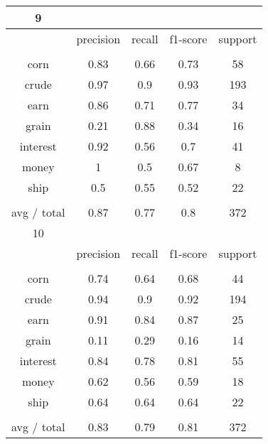 \documentclass[11pt]{article}
\begin{document}
\begin{center}
\begin{longtable}{| c | c | c | c | c |}
9           &           &        &          &         \\
\hline
           & precision & recall & f1-score & support \\
           &           &        &          &         \\
corn        & 0.83      & 0.66   & 0.73     & 58      \\
crude       & 0.97      & 0.9    & 0.93     & 193     \\
earn        & 0.86      & 0.71   & 0.77     & 34      \\
grain       & 0.21      & 0.88   & 0.34     & 16      \\
interest    & 0.92      & 0.56   & 0.7      & 41      \\
money       & 1         & 0.5    & 0.67     & 8       \\
ship        & 0.5       & 0.55   & 0.52     & 22      \\
           &           &        &          &         \\
avg / total & 0.87      & 0.77   & 0.8      & 372     \\
\hline

10          &           &        &          &         \\
\hline
           & precision & recall & f1-score & support \\
           &           &        &          &         \\
corn        & 0.74      & 0.64   & 0.68     & 44      \\
crude       & 0.94      & 0.9    & 0.92     & 194     \\
earn        & 0.91      & 0.84   & 0.87     & 25      \\
grain       & 0.11      & 0.29   & 0.16     & 14      \\
interest    & 0.84      & 0.78   & 0.81     & 55      \\
money       & 0.62      & 0.56   & 0.59     & 18      \\
ship        & 0.64      & 0.64   & 0.64     & 22      \\
           &           &        &          &         \\
avg / total & 0.83      & 0.79   & 0.81     & 372     \\
\hline
\end{longtable}
\end{center}
\end{document}
